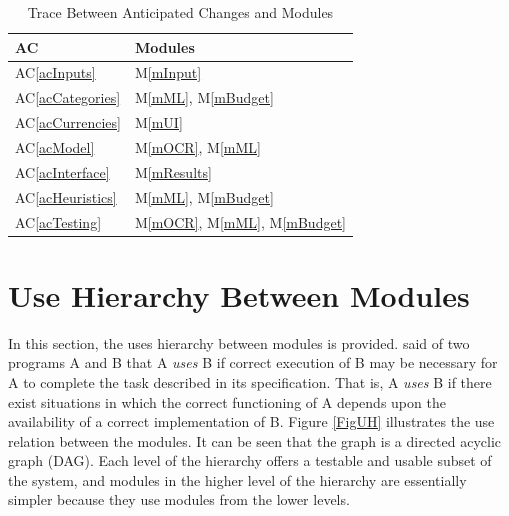 \documentclass[12pt, titlepage]{article}
\newcommand{\acref}[1]{AC\ref{#1}}
\newcommand{\mref}[1]{M\ref{#1}}
\begin{document}
\begin{table}[H]
\centering
\begin{tabular}{p{} p{}}
\toprule
\textbf{AC} & \textbf{Modules}\\
\midrule
\acref{acInputs} & \mref{mInput}\\
\acref{acCategories} & \mref{mML}, \mref{mBudget}\\
\acref{acCurrencies} & \mref{mUI}\\
\acref{acModel} & \mref{mOCR}, \mref{mML}\\
\acref{acInterface} & \mref{mResults}\\
\acref{acHeuristics} & \mref{mML}, \mref{mBudget}\\
\acref{acTesting} & \mref{mOCR}, \mref{mML}, \mref{mBudget}\\
\bottomrule
\end{tabular}
\caption{Trace Between Anticipated Changes and Modules}
\label{TblACT}
\end{table}

\section{Use Hierarchy Between Modules} \label{SecUse}

In this section, the uses hierarchy between modules is
provided. \citet{Parnas1978} said of two programs A and B that A {\em uses} B if
correct execution of B may be necessary for A to complete the task described in
its specification. That is, A {\em uses} B if there exist situations in which
the correct functioning of A depends upon the availability of a correct
implementation of B.  Figure \ref{FigUH} illustrates the use relation between
the modules. It can be seen that the graph is a directed acyclic graph
(DAG). Each level of the hierarchy offers a testable and usable subset of the
system, and modules in the higher level of the hierarchy are essentially simpler
because they use modules from the lower levels.

\end{document}
